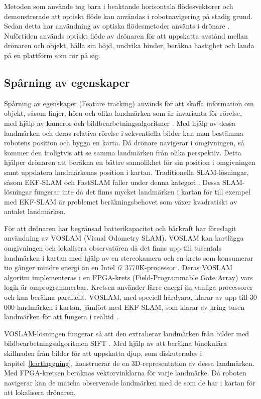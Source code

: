 Metoden som \cite{341094} använde tog bara i beaktande horisontala flödesvektorer och demonstrerade att optiskt flöde kan användas i robotnavigering på stadig grund. Sedan detta har användning av optiska flödesmetoder använts i drönare \citep{6564752}. Nuförtiden används optiskt flöde av drönaren för att uppskatta avstånd mellan drönaren och objekt, hålla sin höjd, undvika hinder, beräkna hastighet och landa på en plattform som rör på sig.

\subsection{Spårning av egenskaper}

Spårning av egenskaper (Feature tracking) används för att skaffa information om objekt, såsom linjer, hörn och olika landmärken som är invarianta för rörelse, med hjälp av kameror och bildbearbetningsalgoritmer \citep{geospatial}. Med hjälp av dessa landmärken och deras relativa rörelse i sekventiella bilder kan man bestämma robotens position och bygga en karta. Då drönare navigerar i omgivningen, så kommer den troligtvis att se samma landmärken från olika perspektiv. Detta hjälper drönaren att beräkna en bättre sannolikhet för sin position i omgivningen samt uppdatera landmärkenas position i kartan. Traditionella SLAM-lösningar, såsom EKF-SLAM och FastSLAM faller under denna kategori \citep{voslamlatif}. Dessa SLAM-lösningar fungerar inte då det finns mycket landmärken i kartan för till exempel med EKF-SLAM är problemet beräkningsbehovet som växer kvadratiskt av antalet landmärken.

För att drönaren har begränsad batterikapacitet och bärkraft har \cite{voslam} föreslagit användning av VOSLAM (Visual Odometry SLAM). VOSLAM kan kartlägga omgivningen och lokalisera observatören då det finns upp till tusentals landmärken i kartan med hjälp av en stereokamera och en krets som konsumerar tio gånger mindre energi än en Intel i7 3770K-processor \citep{voslam}. Deras VOSLAM algoritm implementeras i en FPGA-krets (Field-Programmable Gate Array) vars logik är omprogrammerbar. Kretsen använder färre energi än vanliga processorer och kan beräkna parallellt. VOSLAM, med speciell hårdvara, klarar av upp till 30 000 landmärken i kartan, jämfört med EKF-SLAM, som klarar av kring tusen landmärken för att fungera i realtid \citep{ProbabilisticRobotics, voslam}.

VOSLAM-lösningen fungerar så att den extraherar landmärken från bilder med bildbearbetningsalgoritmen SIFT \citep{voslam}. Med hjälp av att beräkna binokulära skillnaden från bilder för att uppskatta djup, som diskuterades i kapitel~\ref{kartlaggning}, konstruerar de en 3D-representation av dessa landmärken. Med FPGA-kretsen beräknas vektorvinklarna för varje landmärke. Då roboten navigerar kan de matcha observerade landmärken med de som de har i kartan för att lokalisera drönaren. 

